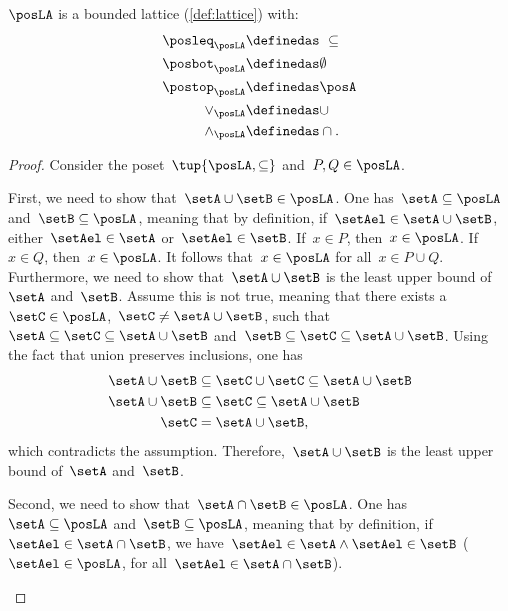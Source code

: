 \begin{lemma}
  $\posLA$ is a bounded lattice (\cref{def:lattice}) with:
  \begin{equation}
  \begin{aligned}
    \posleq_{\posLA}&\definedas \ \subseteq\\
    \posbot_{\posLA}&\definedas \emptyset\\
    \postop_{\posLA}&\definedas \posA\\
    \vee_{\posLA}&\definedas \cup\\
    \wedge_{\posLA}&\definedas \cap.
  \end{aligned}
  \end{equation}
\end{lemma}
\begin{proof}
  Consider the poset~$\tup{\posLA,\subseteq}$ and~$P,Q\in \posLA$.
  \begin{compactitem}
    \item First, we need to show that~$\setA\cup \setB\in \posLA$.
    One has~$\setA \subseteq \posLA$ and~$\setB\subseteq \posLA$, meaning that by definition, if~$\setAel\in \setA\cup \setB$, either~$\setAel\in \setA$ or~$\setAel\in \setB$.
    If~$x\in P$, then~$x\in \posLA$. If~$x\in Q$, then~$x\in \posLA$. It follows that~$x\in \posLA$ for all~$x\in P\cup Q$.
    Furthermore, we need to show that~$\setA\cup \setB$ is the least upper bound of~$\setA$ and~$\setB$.
    Assume this is not true, meaning that  there exists a~$\setC\in \posLA$,~$\setC\neq \setA\cup \setB$, such that~$\setA\subseteq \setC\subseteq \setA\cup \setB$ and~$\setB\subseteq \setC\subseteq \setA\cup \setB$.
    Using the fact that union preserves inclusions, one has
    \begin{equation}
      \begin{aligned}
        \setA\cup \setB &\subseteq \setC\cup \setC \subseteq \setA\cup \setB\\
        \setA\cup \setB &\subseteq \setC \subseteq \setA\cup \setB\\
        \setC&= \setA\cup \setB,
      \end{aligned}
    \end{equation}
    which contradicts the assumption. Therefore,~$\setA\cup \setB$ is the least upper bound of~$\setA$ and~$\setB$.
    \item Second, we need to show that~$\setA\cap \setB\in \posLA$.
    One has~$\setA\subseteq \posLA$ and~$\setB\subseteq \posLA$, meaning that by definition, if~$\setAel\in \setA\cap \setB$, we have~$\setAel \in \setA\wedge \setAel\in \setB$ ($\setAel\in \posLA$, for all~$\setAel\in \setA\cap \setB$).

\end{compactitem}
\end{proof}
